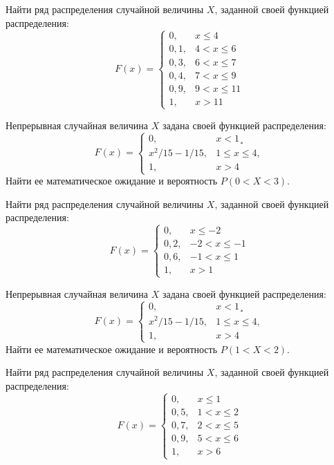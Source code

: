 \vfill

\newpage\setcounter{zad}{0}

\z Найти ряд распределения случайной величины $X$, заданной своей функцией распределения: $$ F(x) = \begin{cases}0, & x \leqslant 4 \\ 0{,}1, & 4 < x \leqslant 6 \\ 0{,}3, & 6 < x \leqslant 7 \\ 0{,}4, & 7 < x \leqslant 9 \\ 0{,}9, & 9 < x \leqslant 11 \\ 1, & x > 11 \end{cases} $$


\vfill

\z Непрерывная случайная величина $X$ задана своей функцией распределения: $$ F(x) = \begin{cases}0, & x < 1¸\\ x^2/15-1/15, & 1 \leqslant x \leqslant 4, \\ 1, & x > 4 \end{cases} $$ Найти ее математическое ожидание и вероятность $P(0 < X < 3)$.
 

\vfill

\newpage\setcounter{zad}{0}

\z Найти ряд распределения случайной величины $X$, заданной своей функцией распределения: $$ F(x) = \begin{cases}0, & x \leqslant -2 \\ 0{,}2, & -2 < x \leqslant -1 \\ 0{,}6, & -1 < x \leqslant 1 \\ 1, & x > 1 \end{cases} $$


\vfill

\z Непрерывная случайная величина $X$ задана своей функцией распределения: $$ F(x) = \begin{cases}0, & x < 1¸\\ x^2/15-1/15, & 1 \leqslant x \leqslant 4, \\ 1, & x > 4 \end{cases} $$ Найти ее математическое ожидание и вероятность $P(1 < X < 2)$.
 

\vfill

\newpage\setcounter{zad}{0}

\z Найти ряд распределения случайной величины $X$, заданной своей функцией распределения: $$ F(x) = \begin{cases}0, & x \leqslant 1 \\ 0{,}5, & 1 < x \leqslant 2 \\ 0{,}7, & 2 < x \leqslant 5 \\ 0{,}9, & 5 < x \leqslant 6 \\ 1, & x > 6 \end{cases} $$


